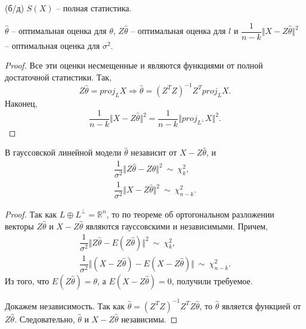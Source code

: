 \begin{theorem}
    (б/д) $\displaystyle S( X)$ -- полная статистика.
\end{theorem}
\begin{corollary}
    $\displaystyle \hat{\theta }$ -- оптимальная оценка для $\displaystyle \theta $, $\displaystyle Z\hat{\theta }$ -- оптимальная оценка для $\displaystyle l$ и $\displaystyle \dfrac{1}{n-k}\Vert X-Z\hat{\theta }\Vert ^{2}$ -- оптимальная оценка для $\displaystyle \sigma ^{2}$.
\end{corollary}
\begin{proof}
    Все эти оценки несмещенные и являются функциями от полной достаточной статистики. Так,
    \begin{equation*}
        Z\hat{\theta } =proj_{L} X\Rightarrow \hat{\theta } =\left( Z^{T} Z\right)^{-1} Z^{T} proj_{L} X.
    \end{equation*}
    Наконец,
    \begin{equation*}
        \dfrac{1}{n-k}\Vert X-Z\hat{\theta }\Vert ^{2} =\dfrac{1}{n-k}\Vert proj_{L^{\perp }} X\Vert ^{2} .
    \end{equation*}
\end{proof}
\begin{proposition}
    В гауссовской линейной модели $\displaystyle \hat{\theta }$ независит от $\displaystyle X-Z\hat{\theta }$, и
    \begin{gather*}
        \dfrac{1}{\sigma ^{2}}\Vert Z\hat{\theta } -Z\theta \Vert ^{2} \ \sim \ \chi _{k}^{2} ,\\
        \dfrac{1}{\sigma ^{2}}\Vert X-Z\hat{\theta }\Vert ^{2} \ \sim \ \chi _{n-k}^{2} .
    \end{gather*}
\end{proposition}
\begin{proof}
    Так как $\displaystyle L\oplus L^{\perp } =\mathbb{R}^{n}$, то по теореме об ортогональном разложении векторы $\displaystyle Z\hat{\theta }$ и $\displaystyle X-Z\hat{\theta }$ являются гауссовскими и независимыми. Причем,
    \begin{gather*}
        \dfrac{1}{\sigma ^{2}}\Vert Z\hat{\theta } -E( Z\hat{\theta })\Vert ^{2} \ \sim \ \chi _{k}^{2} ,\\
        \dfrac{1}{\sigma ^{2}}\Vert ( X-Z\hat{\theta }) -E( X-Z\hat{\theta })\Vert \ \sim \ \chi _{n-k}^{2} .
    \end{gather*}
    Из того, что $\displaystyle E( Z\hat{\theta }) =\theta $, а $\displaystyle E( X-Z\hat{\theta }) =0$, получили требуемое.
    
    Докажем независимость. Так как $\displaystyle \hat{\theta } =\left( Z^{T} Z\right)^{-1} Z^{T} Z\hat{\theta }$, то $\displaystyle \hat{\theta }$ является функцией от $\displaystyle Z\hat{\theta }$. Следовательно, $\displaystyle \hat{\theta }$ и $\displaystyle X-Z\hat{\theta }$ независимы.
\end{proof}
